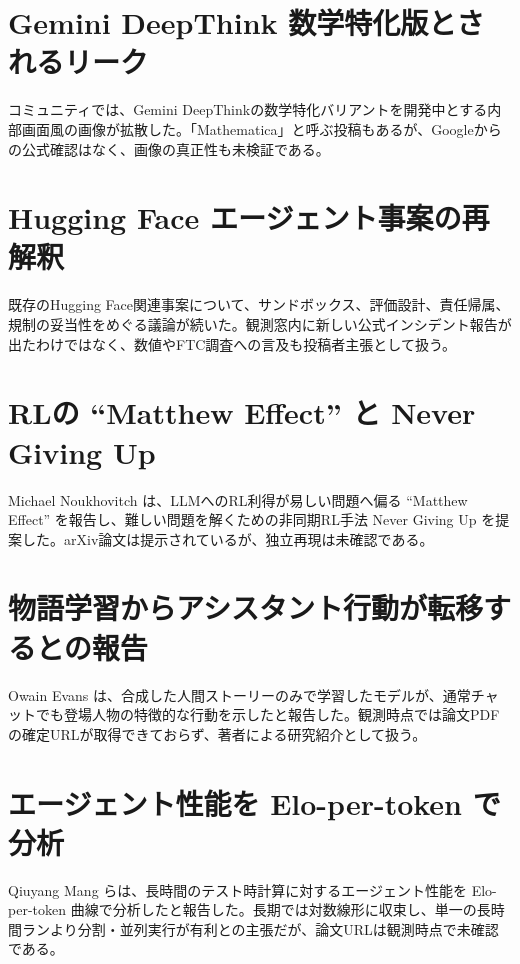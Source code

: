 \section{Gemini DeepThink 数学特化版とされるリーク}
コミュニティでは、Gemini DeepThinkの数学特化バリアントを開発中とする内部画面風の画像が拡散した。「Mathematica」と呼ぶ投稿もあるが、Googleからの公式確認はなく、画像の真正性も未検証である。

\section{Hugging Face エージェント事案の再解釈}
既存のHugging Face関連事案について、サンドボックス、評価設計、責任帰属、規制の妥当性をめぐる議論が続いた。観測窓内に新しい公式インシデント報告が出たわけではなく、数値やFTC調査への言及も投稿者主張として扱う。

\section{RLの ``Matthew Effect'' と Never Giving Up}
Michael Noukhovitch は、LLMへのRL利得が易しい問題へ偏る ``Matthew Effect'' を報告し、難しい問題を解くための非同期RL手法 Never Giving Up を提案した。arXiv論文は提示されているが、独立再現は未確認である。

\section{物語学習からアシスタント行動が転移するとの報告}
Owain Evans は、合成した人間ストーリーのみで学習したモデルが、通常チャットでも登場人物の特徴的な行動を示したと報告した。観測時点では論文PDFの確定URLが取得できておらず、著者による研究紹介として扱う。

\section{エージェント性能を Elo-per-token で分析}
Qiuyang Mang らは、長時間のテスト時計算に対するエージェント性能を Elo-per-token 曲線で分析したと報告した。長期では対数線形に収束し、単一の長時間ランより分割・並列実行が有利との主張だが、論文URLは観測時点で未確認である。

